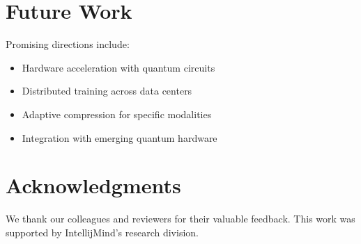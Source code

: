 \documentclass[10pt,twocolumn]{article}
\begin{document}
\section{Future Work}
Promising directions include:
\begin{itemize}
    \item Hardware acceleration with quantum circuits
    \item Distributed training across data centers
    \item Adaptive compression for specific modalities
    \item Integration with emerging quantum hardware
\end{itemize}

\section*{Acknowledgments}
We thank our colleagues and reviewers for their valuable feedback. This work was supported by IntellijMind's research division.
\end{document}
